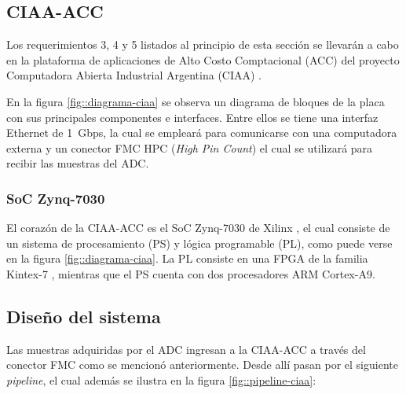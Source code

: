 \documentclass[../../main.tex]{subfiles}
\begin{document}


\subsection{CIAA-ACC}
Los requerimientos 3, 4 y 5 listados al principio de esta sección se llevarán a cabo en la plataforma de aplicaciones de Alto Costo Comptacional (ACC) \cite{CIAA-ACC} del proyecto Computadora Abierta Industrial Argentina (CIAA) \cite{CIAA}.


En la figura \ref{fig::diagrama-ciaa} se observa un diagrama de bloques de la placa con sus principales componentes e interfaces. Entre ellos se tiene una interfaz Ethernet de 1~Gbps, la cual se empleará para comunicarse con una computadora externa y un conector FMC HPC (\textit{High Pin Count}) el cual se utilizará para recibir las muestras del ADC.

\subsubsection{SoC Zynq-7030}
El corazón  de la CIAA-ACC es el SoC Zynq-7030 de Xilinx \cite{SoC}, el cual consiste de un sistema de procesamiento (PS) y lógica programable (PL), como puede verse en la figura \ref{fig::diagrama-ciaa}. La PL consiste en una FPGA de la familia Kintex-7 \cite{Kintex-7}, mientras que el PS cuenta con dos procesadores ARM Cortex-A9.



\subsection{Diseño del sistema}
Las muestras adquiridas por el ADC ingresan a la CIAA-ACC a través del conector FMC como se mencionó anteriormente. Desde allí pasan por el siguiente \textit{pipeline}, el cual además se ilustra en la figura \ref{fig::pipeline-ciaa}:
\end{document}
